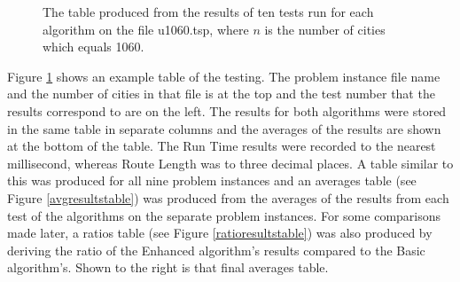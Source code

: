 \documentclass[conference,backref=page]{acmsiggraph}
\begin{document}
\begin{figure}[h]
	\begin{center}
		\caption{The table produced from the results of ten tests run for each algorithm on the file u1060.tsp, where $n$ is the number of cities which equals 1060.}
		\label{exampletesttable}
	\end{center}
\end{figure}

Figure \ref{exampletesttable} shows an example table of the testing. The problem instance file name and the number of cities in that file is at the top and the test number that the results correspond to are on the left. The results for both algorithms were stored in the same table in separate columns and the averages of the results are shown at the bottom of the table. The Run Time results were recorded to the nearest millisecond, whereas Route Length was to three decimal places. A table similar to this was produced for all nine problem instances and an averages table (see Figure \ref{avgresultstable}) was produced from the averages of the results from each test of the algorithms on the separate problem instances. For some comparisons made later, a ratios table (see Figure \ref{ratioresultstable}) was also produced by deriving the ratio of the Enhanced algorithm's results compared to the Basic algorithm's. Shown to the right is that final averages table.
\end{document}

